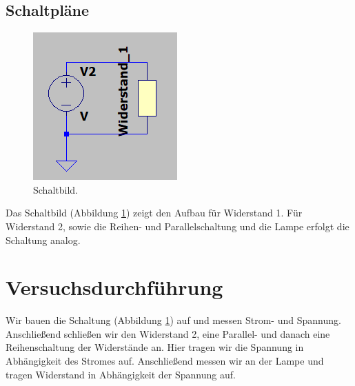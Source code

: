 \documentclass[10pt,a4paper]{article}
\begin{document}
\newpage

\subsection{Schaltpläne}
\begin{flushleft}
\begin{figure}[H]
\centering
\includegraphics[scale=0.5]{schaltbild}
\caption{Schaltbild.}
\label{fig:schalt}
\end{figure}
Das Schaltbild (Abbildung \ref{fig:schalt}) zeigt den Aufbau für Widerstand 1. Für Widerstand 2, sowie die Reihen- und Parallelschaltung und die Lampe erfolgt die Schaltung analog.
\end{flushleft}

\section{Versuchsdurchführung}
\begin{flushleft}
Wir bauen die Schaltung (Abbildung \ref{fig:schalt}) auf und messen Strom- und Spannung. Anschließend schließen wir den Widerstand 2, eine Parallel- und danach eine Reihenschaltung der Widerstände an. Hier tragen wir die Spannung in Abhängigkeit des Stromes auf. Anschließend messen wir an der Lampe und tragen Widerstand in Abhängigkeit der Spannung auf.
\end{flushleft}
\end{document}
